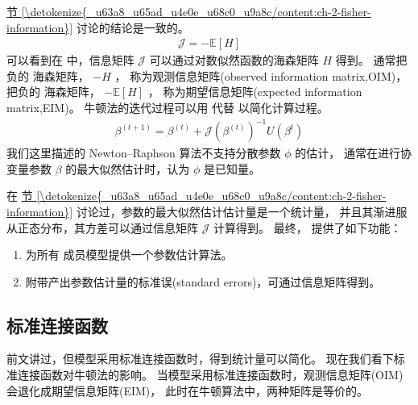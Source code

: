 \documentclass[letterpaper,10pt,english]{sphinxmanual}
\begin{document}
\hyperref[\detokenize{_u63a8_u65ad_u4e0e_u68c0_u9a8c/content:ch-2-fisher-information}]{节 \ref{\detokenize{_u63a8_u65ad_u4e0e_u68c0_u9a8c/content:ch-2-fisher-information}}} 讨论的结论是一致的。
\begin{equation}\label{equation:广义线性模型/estimate:广义线性模型/estimate:27}
\begin{split}\mathcal{J} = - \mathbb{E}[H]\end{split}
\end{equation}
可以看到在  中，信息矩阵 \(\mathcal{J}\) 可以通过对数似然函数的海森矩阵 \(H\) 得到。
通常把负的  海森矩阵， \(-H\) ， 称为观测信息矩阵(observed information matrix,OIM)，
把负的  海森矩阵， \(- \mathbb{E}[H]\) ， 称为期望信息矩阵(expected information matrix,EIM)。
牛顿法的迭代过程可以用  代替  以简化计算过程。
\begin{equation}\label{equation:广义线性模型/estimate:广义线性模型/estimate:28}
\begin{split}\beta^{(t+1)} = \beta^{(t)} + \mathcal{J}(\beta^{(t)})^{-1} U(\beta^t)\end{split}
\end{equation}
我们这里描述的 Newton–Raphson 算法不支持分散参数 \(\phi\) 的估计，
通常在进行协变量参数 \(\beta\) 的最大似然估计时，认为 \(\phi\) 是已知量。

在 \hyperref[\detokenize{_u63a8_u65ad_u4e0e_u68c0_u9a8c/content:ch-2-fisher-information}]{节 \ref{\detokenize{_u63a8_u65ad_u4e0e_u68c0_u9a8c/content:ch-2-fisher-information}}} 讨论过，参数的最大似然估计估计量是一个统计量，
并且其渐进服从正态分布，其方差可以通过信息矩阵 \(\mathcal{J}\) 计算得到。
最终， 提供了如下功能：
\begin{enumerate}
%
\item {} 
为所有  成员模型提供一个参数估计算法。

\item {} 
附带产出参数估计量的标准误(standard errors)，可通过信息矩阵得到。

\end{enumerate}


\subsection{标准连接函数}
\label{\detokenize{_u5e7f_u4e49_u7ebf_u6027_u6a21_u578b/estimate:id8}}
前文讲过，但模型采用标准连接函数时，得到统计量可以简化。
现在我们看下标准连接函数对牛顿法的影响。
当模型采用标准连接函数时，观测信息矩阵(OIM)会退化成期望信息矩阵(EIM)，
此时在牛顿算法中，两种矩阵是等价的。
\end{document}
